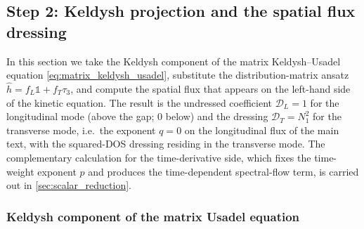 \documentclass[
  aps,
  prb,
  preprint,
  superscriptaddress,
  longbibliography,
  nofootinbib
]{revtex4-2}
\newcommand{\DOS}{N_1}
\newcommand{\fL}{f_L}
\newcommand{\fT}{f_T}
\providecommand{\openone}{}\renewcommand{\openone}{\mathds{1}}
\begin{document}
\subsection{Step 2: Keldysh projection and the spatial flux dressing}
\label{sec:fLfT}

In this section we take the Keldysh component of the matrix
Keldysh--Usadel equation \cref{eq:matrix_keldysh_usadel}, substitute the
distribution-matrix ansatz
\(\hat h=\fL\openone+\fT\tau_3\), and compute the spatial flux that
appears on the left-hand side of the kinetic equation. The result is the
undressed coefficient \(\mathcal D_L=1\) for the longitudinal mode (above
the gap; \(0\) below) and the dressing
\(\mathcal D_T=\DOS^2\) for the transverse mode, i.e.\ the exponent
\(q=0\) on the longitudinal flux of the main text, with the squared-DOS
dressing residing in the transverse mode. The complementary calculation for
the time-derivative side, which fixes the time-weight exponent \(p\) and
produces the time-dependent spectral-flow term, is carried out in
\cref{sec:scalar_reduction}.

\subsubsection{Keldysh component of the matrix Usadel equation}
\label{sec:K_block}
\end{document}
